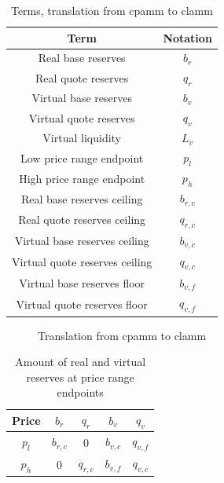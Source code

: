 \documentclass[table, twocolumn]{article}
\begin{document}
\begin{table}[!htb]
  \centering
  \begin{tabular}{|c|c|}
    \hline \rowcolor{blue}
    Term                           & Notation  \\ \hline
    Real base reserves             & $b_r$     \\ \hline
    Real quote reserves            & $q_r$     \\ \hline
    Virtual base reserves          & $b_v$     \\ \hline
    Virtual quote reserves         & $q_v$     \\ \hline
    Virtual liquidity              & $L_v$     \\ \hline
    Low price range endpoint       & $p_l$     \\ \hline
    High price range endpoint      & $p_h$     \\ \hline
    Real base reserves ceiling     & $b_{r,c}$ \\ \hline
    Real quote reserves ceiling    & $q_{r,c}$ \\ \hline
    Virtual base reserves ceiling  & $b_{v,c}$ \\ \hline
    Virtual quote reserves ceiling & $q_{v,c}$ \\ \hline
    Virtual base reserves floor    & $b_{v,f}$ \\ \hline
    Virtual quote reserves floor   & $q_{v,f}$ \\ \hline
  \end{tabular}
  \caption{Terms, translation from \gls{cpamm} to \gls{clamm}}
  \label{tab:clamm-curve-translation}
\end{table}

\begin{figure}[!htb]
  \centering
  
  \caption{Translation from \gls{cpamm} to \gls{clamm}}
  \label{fig:clamm-curve-translation}
\end{figure}

\begin{table}[!htb]
  \centering
  \begin{tabular}{|c|c|c|c|c|}
    \hline \rowcolor{blue}
    Price & $b_r$      & $q_r$        & $b_v$      & $q_v$      \\ \hline
    $p_l$ & $b_{r, c}$ & 0            & $b_{v, c}$ & $q_{v, f}$ \\ \hline
    $p_h$ & 0          & ${q_{r, c}}$ & $b_{v, f}$ & $q_{v, c}$ \\ \hline
  \end{tabular}
  \caption{Amount of real and virtual reserves at price range endpoints}
  \label{tab:clamm-curve-endpoint-reserves}
\end{table}
\end{document}
